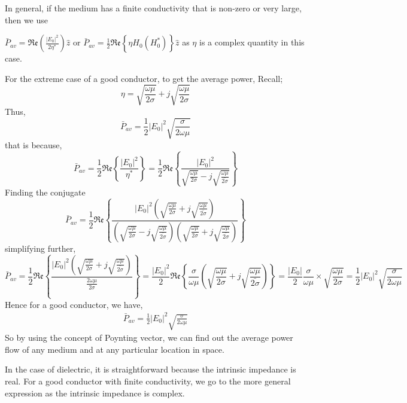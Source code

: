 In general, if the medium has a finite conductivity that is non-zero or very large, then we use

$ \bar{P}_{av}=\mathfrak{Re}(\frac{|E_0|^{2}}{2\eta^{*}})\hat{z} $ or  $ \bar{P}_{av}= \frac{1}{2}\mathfrak{Re}\left\{\eta H_0(H_0^{*})\right\}\hat{z} $ 
as $ \eta $ is a complex quantity in this case.

For the extreme case of a good conductor, to get the average power, Recall;
\begin{dmath*}
\eta=\sqrt{\frac{\omega\mu}{2\sigma}}+j\sqrt{\frac{\omega\mu}{{2\sigma}}}
\end{dmath*}
Thus,
\begin{dmath*}
\bar{P}_{av}=\frac{1}{2}|E_0|^{2}\sqrt{\frac{\sigma}{2\omega\mu}} 
\end{dmath*}
that is because,
\begin{dmath*}
\bar{P}_{av}=\frac{1}{2}\mathfrak{Re}\left\{\frac{|E_0|^{2}}{\eta^{*}}\right\}=\frac{1}{2}\mathfrak{Re}\left\{\frac{|E_0|^{2}}{\sqrt{\frac{\omega\mu}{2\sigma}}-j\sqrt{\frac{\omega\mu}{\bar{2\sigma}}}}\right\}
\end{dmath*}
Finding the conjugate
\begin{dmath*}
\bar{P}_{av}= \frac{1}{2}\mathfrak{Re}\left\{\frac{|E_0|^{2}\left(\sqrt{\frac{\omega\mu}{2\sigma}}+j\sqrt{\frac{\omega\mu}{\bar{2\sigma}}}\right)}{\left(\sqrt{\frac{\omega\mu}{2\sigma}}-j\sqrt{\frac{\omega\mu}{\bar{2\sigma}}}\right)\left(\sqrt{\frac{\omega\mu}{2\sigma}}+j\sqrt{\frac{\omega\mu}{\bar{2\sigma}}}\right)}\right\}
\end{dmath*}
simplifying further,
\begin{dmath*}
\bar{P}_{av}=\frac{1}{2}\mathfrak{Re}\left\{\frac{|E_0|^{2}(\sqrt{\frac{\omega\mu}{2\sigma}}+j\sqrt{\frac{\omega\mu}{\bar{2\sigma}}})}{\frac{2\omega\mu}{2\sigma}}\right\}
= \frac{|E_0|^{2}}{2}\mathfrak{Re}\left\{\frac{\sigma}{\omega\mu}\left(\sqrt{\frac{\omega\mu}{2\sigma}}+j\sqrt{\frac{\omega\mu}{\bar{2\sigma}}}\right) \right\}
=\frac{|E_0|}{2}\frac{\sigma}{\omega\mu}\times\sqrt{\frac{\omega\mu}{2\sigma}}=\frac{1}{2}|E_0|^{2}\sqrt{\frac{\sigma}{2\omega\mu}} 
\end{dmath*}
Hence for a good conductor, we have, 
\begin{align}
\bar{P}_{av}=\frac{1}{2}|E_0|^{2}\sqrt{\frac{\sigma}{2\omega\mu}} 
\end{align}
So by using the concept of Poynting vector, we can find out the average power flow of any medium and at any particular location in space.

In the case of dielectric, it is straightforward because the intrinsic impedance is real. For a good conductor with finite conductivity, we go to the more general expression as the intrinsic impedance is complex.

